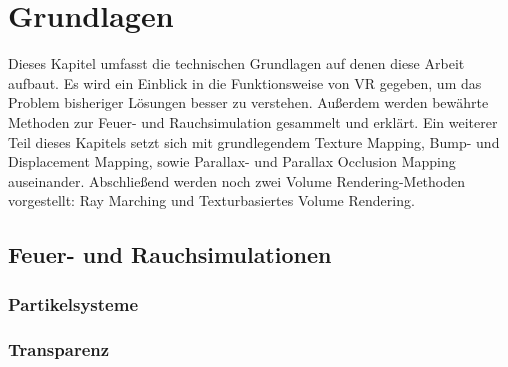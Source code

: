 \section{Grundlagen}
\label{sec:3}
Dieses Kapitel umfasst die technischen Grundlagen auf denen diese Arbeit aufbaut. 
Es wird ein Einblick in die Funktionsweise von VR gegeben, um das Problem bisheriger Lösungen 
besser zu verstehen. Außerdem werden bewährte Methoden zur Feuer- und Rauchsimulation
gesammelt und erklärt. Ein weiterer Teil dieses Kapitels setzt sich mit grundlegendem Texture Mapping,
Bump- und Displacement Mapping, sowie Parallax- und Parallax Occlusion Mapping auseinander. Abschließend 
werden noch zwei Volume Rendering-Methoden vorgestellt: Ray Marching und Texturbasiertes Volume Rendering.



\subsection{Feuer- und Rauchsimulationen}
\subsubsection{Partikelsysteme}
\subsubsection{Transparenz}





\newpage
